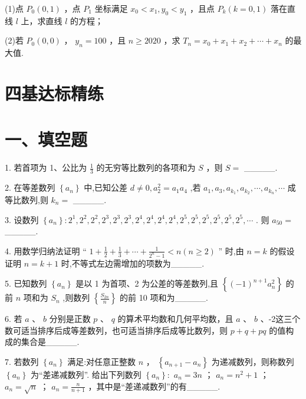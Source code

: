 (1)点 ${P}_{0}\left( {0,1}\right)$ ，点 ${P}_{1}$ 坐标满足 ${x}_{0} < {x}_{1},{y}_{0} < {y}_{1}$ ，且点 ${P}_{k}\left( {k = 0,1}\right)$ 落在直线 $l$ 上，求直线 $l$ 的方程；

(2)若 ${P}_{0}\left( {0,0}\right)$ ， ${y}_{n} = {100}$ ，且 $n \geq  {2020}$ ，求 ${T}_{n} = {x}_{0} + {x}_{1} + {x}_{2} + \cdots  + {x}_{n}$ 的最大值.

\section*{四基达标精练}

\section*{一、填空题}

1. 若首项为 1、公比为 $\frac{1}{3}$ 的无穷等比数列的各项和为 $S$ ，则 $S =$ \_\_\_\_\_.

2. 在等差数列 $\left\{  {a}_{n}\right\}$ 中,已知公差 $d \neq  0,{a}_{2}^{2} = {a}_{1}{a}_{4}$ ,若 ${a}_{1},{a}_{3},{a}_{{k}_{1}},{a}_{{k}_{2}},\cdots ,{a}_{{k}_{n}},\cdots$ 成等比数列,则 ${k}_{n} =$ \_\_\_\_\_.

3. 设数列 $\left\{  {a}_{n}\right\}   : {2}^{1},{2}^{2},{2}^{2},{2}^{3},{2}^{3},{2}^{3},{2}^{4},{2}^{4},{2}^{4},{2}^{4},{2}^{5},{2}^{5},{2}^{5},{2}^{5},{2}^{5},{2}^{5},\cdots$ . 则 ${a}_{50} =$ \_\_\_\_\_.

4. 用数学归纳法证明 “ $1 + \frac{1}{2} + \frac{1}{3} + \cdots  + \frac{1}{{2}^{n} - 1} < n\left( {n \geq  2}\right)$ ” 时,由 $n = k$ 的假设证明 $n = k + 1$ 时,不等式左边需增加的项数为\_\_\_\_\_.

5. 已知数列 $\left\{  {a}_{n}\right\}$ 是以 1 为首项、2 为公差的等差数列,且 $\left\{  {{\left( -1\right) }^{n + 1}{a}_{n}^{2}}\right\}$ 的前 $n$ 项和为 ${S}_{n}$ ,则数列 $\left\{  \frac{{S}_{2n}}{n}\right\}$ 的前 10 项和为\_\_\_\_\_.

6. 若 $a$ 、 $b$ 分别是正数 $p$ 、 $q$ 的算术平均数和几何平均数，且 $a$ 、 $b$ 、-2这三个数可适当排序后成等差数列，也可适当排序后成等比数列，则 $p + q + {pq}$ 的值构成的集合是\_\_\_\_\_.

7. 若数列 $\left\{  {a}_{n}\right\}$ 满足:对任意正整数 $n$ ， $\left\{  {{a}_{n + 1} - {a}_{n}}\right\}$ 为递减数列，则称数列 $\left\{  {a}_{n}\right\}$ 为“差递减数列”. 给出下列数列 $\left\{  {a}_{n}\right\}   :$    ${a}_{n} = {3n}$ ；    ${a}_{n} = {n}^{2} + 1$ ；   ${a}_{n} = \sqrt{n}$ ；   ${a}_{n} = \frac{n}{n + 1}$ ，其中是“差递减数列”的有\_\_\_\_\_.

